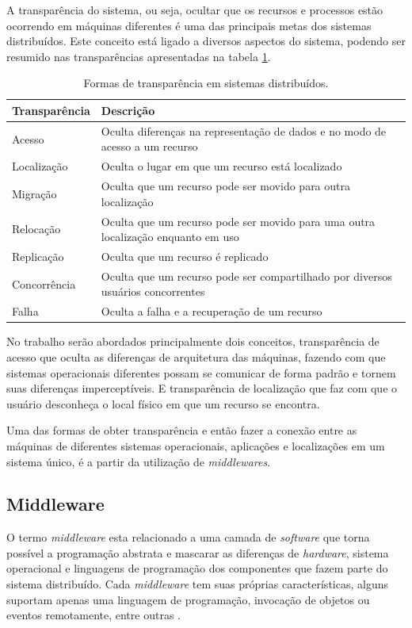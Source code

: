 	A transparência do sistema, ou seja, ocultar que os recursos e processos estão ocorrendo em máquinas diferentes é uma das principais metas dos sistemas distribuídos. Este conceito está ligado a diversos aspectos do sistema, podendo ser resumido nas transparências apresentadas na tabela \ref{transparencia}.
	
	\begin{table}[]
		\caption{Formas de transparência em sistemas distribuídos.}
		\label{transparencia}
		\begin{tabularx}{\linewidth}{|l|m|}
			\hline
			\textbf{Transparência} & \textbf{Descrição} \\ \hline
			Acesso & Oculta diferenças na representação de dados e no modo de acesso a um recurso \\ \hline
			Localização & Oculta o lugar em que um recurso está localizado \\ \hline
			Migração & Oculta que um recurso pode ser movido para outra localização \\ \hline
			Relocação & Oculta que um recurso pode ser movido para uma outra localização enquanto em uso \\ \hline
			Replicação & Oculta que um recurso é replicado \\ \hline
			Concorrência & Oculta que um recurso pode ser compartilhado por diversos usuários concorrentes \\ \hline
			Falha & Oculta a falha e a recuperação de um recurso \\ \hline
		\end{tabularx}
	\end{table}
	
	No trabalho serão abordados principalmente dois conceitos, transparência de acesso que oculta as diferenças de arquitetura das máquinas, fazendo com que sistemas operacionais diferentes possam se comunicar de forma padrão e tornem suas diferenças imperceptíveis. E transparência de localização que faz com que o usuário desconheça o local físico em que um recurso se encontra. 
	
	Uma das formas de obter transparência e então fazer a conexão entre as máquinas de diferentes sistemas operacionais, aplicações e localizações em um sistema único, é a partir da utilização de \textit{middlewares}. 
	
	\subsection{Middleware}
	O termo \textit{middleware} esta relacionado a uma camada de \textit{software} que torna possível a programação abstrata e mascarar as diferenças de \textit{hardware}, sistema operacional e linguagens de programação dos componentes que fazem parte do sistema distribuído. Cada \textit{middleware} tem suas próprias características, alguns suportam apenas uma linguagem de programação, invocação de objetos ou eventos remotamente, entre outras \cite{Coulouris-2012}.
	
